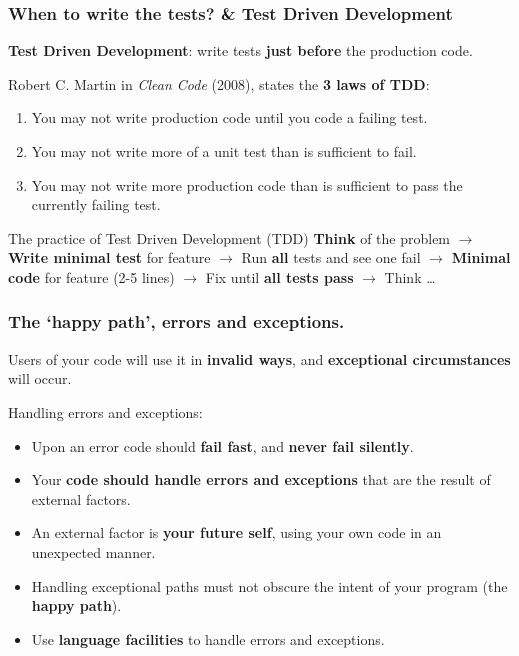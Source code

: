 \documentclass{beamer} %
\newcommand\emc[1]{\textcolor{brightblue}{\textbf{#1}}}
\begin{document}
\begin{frame}
\frametitle{When to write the tests? \& Test Driven Development}

\emc{Test Driven Development}: write tests \emc{just before} the production code.

\vspace{2mm}
Robert C. Martin in \emph{Clean Code} (2008), states the \emc{3 laws of TDD}:
\begin{enumerate}
	\item You may not write production code until you code a failing test.
	\item You may not write more of a unit test than is sufficient to fail.
	\item You may not write more production code than is sufficient to pass the currently failing test.
\end{enumerate}

\vspace{2mm}
\begin{block}{The practice of Test Driven Development (TDD)}
\emc{Think} of the problem $\rightarrow$ \emc{Write minimal test} for feature $\rightarrow$ Run \emc{all} tests and see one fail $\rightarrow$ \emc{Minimal code} for feature (2-5 lines) $\rightarrow$ Fix until \emc{all tests pass} $\rightarrow$ Think \ldots
\end{block}

\end{frame}


\begin{frame}
\frametitle{The `happy path', errors and exceptions.}

Users of your code will use it in \emc{invalid ways}, and \emc{exceptional circumstances} will occur.

\vspace{3mm}
Handling errors and exceptions:
\begin{itemize}
	\item Upon an error code should \emc{fail fast}, and \emc{never fail silently}.
	\item Your \emc{code should handle errors and exceptions} that are the result of external factors.
	\item An external factor is \emc{your future self}, using your own code in an unexpected manner.
	\item Handling exceptional paths must not obscure the intent of your program (the \emc{happy path}).
	\item Use \emc{language facilities} to handle errors and exceptions.
\end{itemize}

\end{frame}
\end{document}
